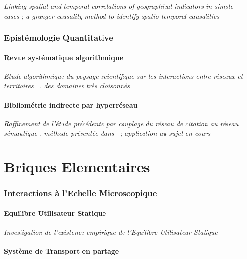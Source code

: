 \textit{Linking spatial and temporal correlations of geographical indicators in simple cases ; a granger-causality method to identify spatio-temporal causalities}




\section{Epistémologie Quantitative}

\subsection{Revue systématique algorithmique}

\textit{Etude algorithmique du paysage scientifique sur les interactions entre réseaux et territoires~\cite{raimbault2015models} : des domaines très cloisonnés}


\subsection{Bibliométrie indirecte par hyperréseau}


\textit{Raffinement de l'étude précédente par couplage du réseau de citation au réseau sémantique : méthode présentée dans~\cite{raimbault2016indirect} ; application au sujet en cours} 

\part{Briques Elementaires}

\section{Interactions à l'Echelle Microscopique}

\subsection{Equilibre Utilisateur Statique}

\textit{Investigation de l'existence empirique de l'Equilibre Utilisateur Statique~\cite{raimbault2016investigating}}


\subsection{Système de Transport en partage}

